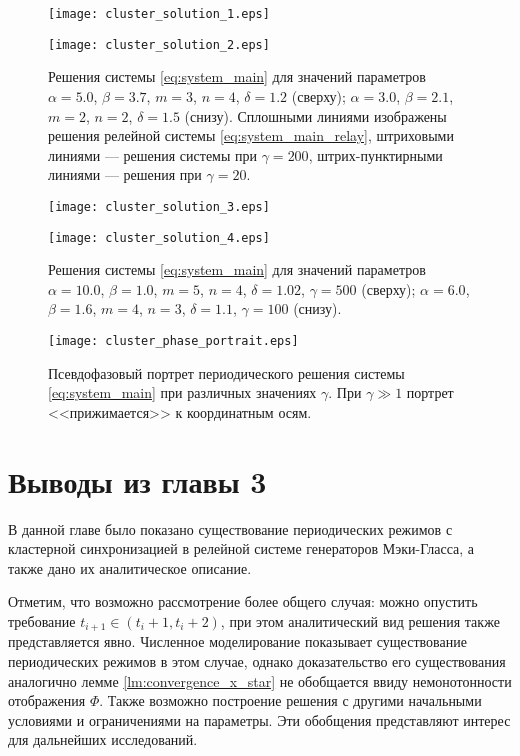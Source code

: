 \begin{figure}[!htb]
	\centering
	
	\texttt{[image: cluster\_solution\_1.eps]}
	
	\smallskip
	
	\texttt{[image: cluster\_solution\_2.eps]}
	
	\caption{Решения системы \eqref{eq:system_main} для значений параметров $\alpha = 5.0$, $\beta = 3.7$, $m = 3$, $n = 4$, $\delta = 1.2$  (сверху); $\alpha = 3.0$, $\beta = 2.1$, $m = 2$, $n = 2$, $\delta = 1.5$ (снизу). Сплошными линиями изображены решения релейной системы \eqref{eq:system_main_relay}, штриховыми линиями --- решения системы при $\gamma = 200$, штрих-пунктирными линиями --- решения при $\gamma = 20$.
	}
	\label{fig:cluster_solution}
\end{figure}

\begin{figure}[!htb]
	\centering
	\texttt{[image: cluster\_solution\_3.eps]}
	
	\smallskip
	
	\texttt{[image: cluster\_solution\_4.eps]}
	
	\caption{Решения системы \eqref{eq:system_main} для значений параметров $\alpha = 10.0$, $\beta = 1.0$, $m = 5$, $n = 4$, $\delta = 1.02$, $\gamma = 500$ (сверху); $\alpha = 6.0$, $\beta = 1.6$, $m = 4$, $n = 3$, $\delta = 1.1$, $\gamma = 100$ (снизу).}
	\label{fig:cluster_solution2}
\end{figure}

\begin{figure}[!htb]
	\centering
	\texttt{[image: cluster\_phase\_portrait.eps]}
	\caption{Псевдофазовый портрет периодического решения системы \eqref{eq:system_main} при различных значениях $\gamma$. При $\gamma \gg 1$ портрет <<прижимается>> к координатным осям.}
	\label{fig:phase_portrait}
\end{figure} 

\section{Выводы из главы 3}\label{sec:ch3/sect6}
В данной главе было показано существование периодических режимов с кластерной синхронизацией в релейной системе генераторов Мэки-Гласса, а также дано их аналитическое описание.

Отметим, что возможно рассмотрение более общего случая: можно опустить требование $t_{i + 1} \in (t_{i} + 1, t_{i} + 2)$, при этом аналитический вид решения также представляется явно. Численное моделирование показывает существование периодических режимов в этом случае, однако доказательство его существования аналогично лемме \ref{lm:convergence_x_star} не обобщается ввиду немонотонности отображения $\Phi$. Также возможно построение решения с другими начальными условиями и ограничениями на параметры. Эти обобщения представляют интерес для дальнейших исследований.
